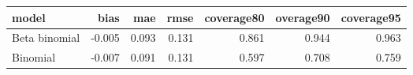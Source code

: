 \begin{table}[ht]
\centering
\begin{tabular}{lrrrrrr}
  \hline
model & bias & mae & rmse & coverage80 & overage90 & coverage95 \\ 
  \hline
Beta binomial & -0.005 & 0.093 & 0.131 & 0.861 & 0.944 & 0.963 \\ 
  Binomial & -0.007 & 0.091 & 0.131 & 0.597 & 0.708 & 0.759 \\ 
   \hline
\end{tabular}
\end{table}
